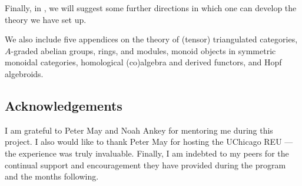 \documentclass[../main.tex]{subfiles}
\begin{document}
Finally, in , we will suggest some further directions in which one can develop the theory we have set up.

We also include five appendices on the theory of (tensor) triangulated categories, $A$-graded abelian groups, rings, and modules, monoid objects in symmetric monoidal categories, homological (co)algebra and derived functors, and Hopf algebroids.

\subsection{Acknowledgements}

I am grateful to Peter May and Noah Ankey for mentoring me during this project. I also would like to thank Peter May for hosting the UChicago REU --- the experience was truly invaluable. Finally, I am indebted to my peers for the continual support and encouragement they have provided during the program and the months following.
\end{document}
